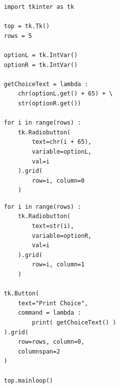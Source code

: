 \begin{frame}[fragile]
%
\begin{tcbraster}[raster columns=2,
                  raster equal height,
                  nobeforeafter,
                  raster column skip=0.5cm]
\begin{codebox}
\begin{verbatim}
import tkinter as tk

top = tk.Tk()
rows = 5

optionL = tk.IntVar()
optionR = tk.IntVar()

getChoiceText = lambda : 
    chr(optionL.get() + 65) + \
    str(optionR.get())

for i in range(rows) :
    tk.Radiobutton(
        text=chr(i + 65),
        variable=optionL,
        val=i
    ).grid(
        row=i, column=0
    )
\end{verbatim}
\end{codebox}
%
\begin{codebox}[... Continued]
\begin{verbatim}
for i in range(rows) :
    tk.Radiobutton(
        text=str(i),
        variable=optionR,
        val=i
    ).grid(
        row=i, column=1
    )

tk.Button(
    text="Print Choice",
    command = lambda :
        print( getChoiceText() )
).grid(
    row=rows, column=0,
    columnspan=2
)

top.mainloop()
\end{verbatim}
\end{codebox}
\end{tcbraster}
%
\end{frame}


